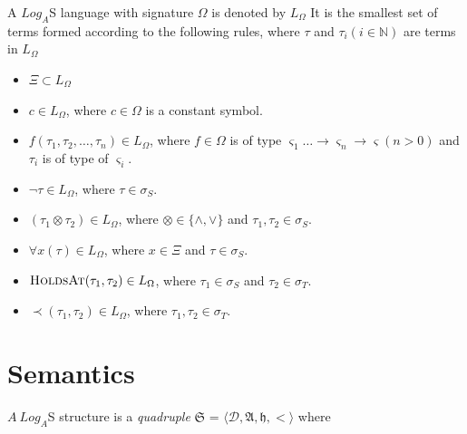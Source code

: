 A $Log_A$S language with signature $\Omega$ is denoted by $L_{\Omega}$ It
is the smallest set of terms formed according to the following
rules, where $\tau$ and $\tau_i (i \in \mathbb{N})$ are terms in $L_{\Omega}$

\begin{itemize}
	\item $\Xi \subset L_{\Omega}$
	\item $c \in L_{\Omega}$, where $c \in \Omega$ is a constant symbol.
	\item $f(\tau_1, \tau_2, \dots, \tau_n) \in L_{\Omega}$, where $f \in \Omega$ is of type
	      $\varsigma_1 \dots \to \varsigma_n \to \varsigma  (n > 0)$ and $\tau_i$ is of type of $\varsigma_i$.
	\item $\neg \tau \in L_{\Omega}$, where $\tau \in \sigma_S$.
	\item $(\tau_1 \otimes \tau_2) \in L_{\Omega}$, where $\otimes \in \{\land, \lor\}$ and $\tau_1, \tau_2 \in \sigma_S$.
	\item $\forall x(\tau) \in L_{\Omega}$, where $x \in \Xi$ and $\tau \in \sigma_S$.
	\item $\textsc{HoldsAt}(\tau_1, \tau_2) \in L_{\Omega}$, where $\tau_1 \in \sigma_S$ and $\tau_2 \in \sigma_T$.
	\item $\prec(\tau_1, \tau_2) \in L_{\Omega}$, where $\tau_1, \tau_2 \in \sigma_T$.
\end{itemize}


\section{Semantics}

\begin{defn} $A  \ Log_A$S structure is a \textit{quadruple} $\mathfrak{S}$
	= $\langle \mathcal{D}, \mathfrak{A}, \mathfrak{h}, < \rangle$ where
\end{defn}

